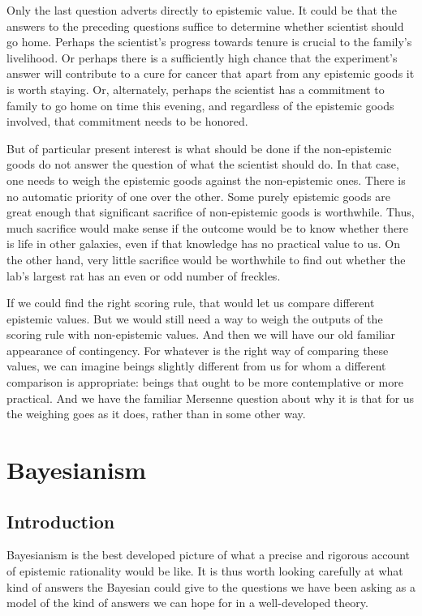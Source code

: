 Only the last question adverts directly to epistemic value. It could be that the answers to the preceding questions suffice
to determine whether scientist should go home. Perhaps the scientist's progress towards tenure is crucial to the 
family's livelihood. Or perhaps there is a sufficiently high chance that the experiment's answer will contribute
to a cure for cancer that apart from any epistemic goods it is worth staying. Or, alternately, perhaps the scientist
has a commitment to family to go home on time this evening, and regardless of the epistemic goods involved, that
commitment needs to be honored. 

But of particular present interest is what should be done if the non-epistemic
goods do not answer the question of what the scientist should do. In that case, one needs to weigh the
epistemic goods against the non-epistemic ones. There is no automatic priority of one over the other.
Some purely epistemic goods are great enough that significant sacrifice of non-epistemic goods is worthwhile.
Thus, much sacrifice would make sense if the outcome would be to know whether there is life in other galaxies,
even if that knowledge has no practical value to us. On the other hand, very little sacrifice
would be worthwhile to find out whether the lab's largest rat has an even or odd number of freckles.

If we could find the right scoring rule, that would let us compare different epistemic values. But we would
still need a way to weigh the outputs of the scoring rule with non-epistemic values. And then we will have
our old familiar appearance of contingency. For whatever is the right way of comparing these values, we can
imagine beings slightly different from us for whom a different comparison is appropriate: beings that ought
to be more contemplative or more practical. And we have the familiar Mersenne question about why it is that 
for us the weighing goes as it does, rather than in some other way.

\section{Bayesianism}\label{sec:Bayesianism}
\subsection{Introduction}
Bayesianism is the best developed picture of what a precise and rigorous account of epistemic rationality would be like.
It is thus worth looking carefully at what kind of answers the Bayesian could give to the questions we have been asking
as a model of the kind of answers we can hope for in a well-developed theory.


